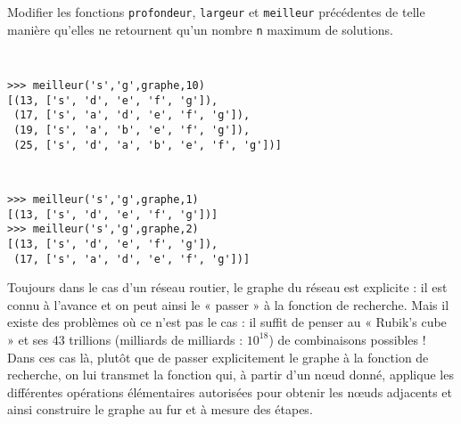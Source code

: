 \begin{question} Modifier les fonctions
\texttt{profondeur}, \linebreak\texttt{largeur} et \texttt{meilleur} précédentes de telle
manière qu'elles ne retournent qu'un nombre \texttt{n} maximum de solutions.

\noindent\begin{minipage}[t]{7cm}\tt\footnotesize
\begin{Verbatim}
>>> meilleur('s','g',graphe,10)
[(13, ['s', 'd', 'e', 'f', 'g']), 
 (17, ['s', 'a', 'd', 'e', 'f', 'g']), 
 (19, ['s', 'a', 'b', 'e', 'f', 'g']), 
 (25, ['s', 'd', 'a', 'b', 'e', 'f', 'g'])]
\end{Verbatim}
\end{minipage}
\hfill
\begin{minipage}[t]{7cm}\tt\footnotesize
\begin{Verbatim}
>>> meilleur('s','g',graphe,1)
[(13, ['s', 'd', 'e', 'f', 'g'])]
>>> meilleur('s','g',graphe,2)
[(13, ['s', 'd', 'e', 'f', 'g']), 
 (17, ['s', 'a', 'd', 'e', 'f', 'g'])]
\end{Verbatim}
\end{minipage}
\vspace*{2mm}

\end{question}

Toujours dans le cas d'un réseau routier, le graphe du réseau est explicite : 
il est connu à l'avance et on peut ainsi le « passer » à la fonction de recherche. 
Mais il existe des problèmes où ce n'est pas le cas : il suffit de penser au 
« Rubik's cube » et ses 43 trillions (milliards de milliards : $10^{18}$) de 
combinaisons possibles ! Dans ces cas là, plutôt que de passer explicitement 
le graphe à la fonction de recherche, on lui transmet la fonction qui, à partir 
d'un n\oe ud donné, applique les différentes opérations élémentaires autorisées
pour obtenir les n\oe uds adjacents et ainsi construire le graphe au fur et à 
mesure des étapes.

